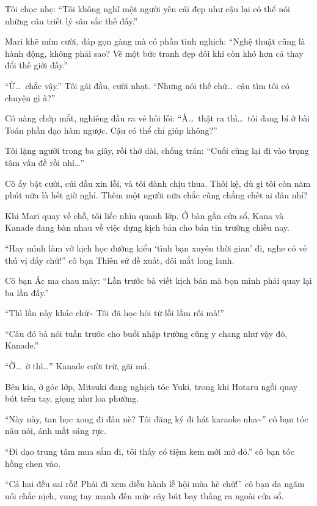 \documentclass[../main.tex]{subfiles}
\begin{document}
Tôi chọc nhẹ: ``Tôi không nghĩ một người yêu cái đẹp như cậu lại có thể nói những câu triết lý sâu sắc thế đấy.''

Mari khẽ mỉm cười, đáp gọn gàng mà có phần tinh nghịch: ``Nghệ thuật cũng là hành động, không phải sao? Vẽ một bức tranh đẹp đôi khi còn khó hơn cả thay đổi thế giới đấy.''

``Ừ\dots\ chắc vậy.'' Tôi gãi đầu, cười nhạt. ``Nhưng nói thế chứ\dots\ cậu tìm tôi có chuyện gì à?''

Cô nàng chớp mắt, nghiêng đầu ra vẻ hối lỗi: ``À\dots\ thật ra thì\dots\ tôi đang bí ở bài Toán phần đạo hàm ngược. Cậu có thể chỉ giúp không?''

Tôi lặng người trong ba giây, rồi thở dài, chống trán: ``Cuối cùng lại đi vào trọng tâm vấn đề rồi nhỉ\dots''

Cô ấy bật cười, cúi đầu xin lỗi, và tôi đành chịu thua. Thôi kệ, dù gì tôi còn năm phút nữa là hết giờ nghỉ. Thêm một người nữa chắc cũng chẳng chết ai đâu nhỉ?

\ct

Khi Mari quay về chỗ, tôi liếc nhìn quanh lớp. Ở bàn gần cửa sổ, Kana và Kanade đang bàn nhau về việc dựng kịch bản cho bản tin trường chiều nay.


``Hay mình làm vở kịch học đường kiểu `tình bạn xuyên thời gian' đi, nghe có vẻ thú vị đấy chứ!''  cô bạn Thiên sứ đề xuất, đôi mắt long lanh.

Cô bạn Ác ma chau mày: ``Lần trước bà viết kịch bản mà bọn mình phải quay lại ba lần đấy.''

``Thì lần này khác chứ\~{} Tôi đã học hỏi từ lỗi lầm rồi mà!''

``Câu đó bà nói tuần trước cho buổi nhập trường cũng y chang như vậy đó, Kanade.''

``Ờ\dots\ ờ thì\dots'' Kanade cười trừ, gãi má.

Bên kia, ở góc lớp, Mitsuki đang nghịch tóc Yuki, trong khi Hotaru ngồi quay bút trên tay, giọng như loa phường.


``Này này, tan học xong đi đâu nè? Tôi đăng ký đi hát karaoke nha\~{}'' cô bạn tóc nâu nói, ánh mắt sáng rực.

``Đi dạo trung tâm mua sắm đi, tôi thấy có tiệm kem mới mở đó.'' cô bạn tóc hồng chen vào.

``Cả hai đều sai rồi! Phải đi xem diễu hành lễ hội mùa hè chứ!'' cô bạn da ngăm nói chắc nịch, vung tay mạnh đến mức cây bút bay thẳng ra ngoài cửa sổ.
\end{document}
